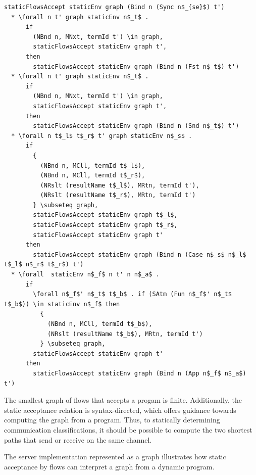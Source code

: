 \documentclass[letterpaper, 11pt]{extarticle}
\begin{document}
\begin{lstlisting}[language=logic, mathescape]
        staticFlowsAccept staticEnv graph (Bind n (Sync n$_{se}$) t')
  * \forall n t' graph staticEnv n$_t$ .
      if
        (NBnd n, MNxt, termId t') \in graph, 
        staticFlowsAccept staticEnv graph t', 
      then
        staticFlowsAccept staticEnv graph (Bind n (Fst n$_t$) t')
  * \forall n t' graph staticEnv n$_t$ .
      if
        (NBnd n, MNxt, termId t') \in graph, 
        staticFlowsAccept staticEnv graph t', 
      then
        staticFlowsAccept staticEnv graph (Bind n (Snd n$_t$) t')
  * \forall n t$_l$ t$_r$ t' graph staticEnv n$_s$ .
      if
        {
          (NBnd n, MCll, termId t$_l$),
          (NBnd n, MCll, termId t$_r$),
          (NRslt (resultName t$_l$), MRtn, termId t'),
          (NRslt (resultName t$_r$), MRtn, termId t')
        } \subseteq graph, 
        staticFlowsAccept staticEnv graph t$_l$, 
        staticFlowsAccept staticEnv graph t$_r$,
        staticFlowsAccept staticEnv graph t'
      then
        staticFlowsAccept staticEnv graph (Bind n (Case n$_s$ n$_l$ t$_l$ n$_r$ t$_r$) t')
  * \forall  staticEnv n$_f$ n t' n n$_a$ .
      if
        \forall n$_f$' n$_t$ t$_b$ . if (SAtm (Fun n$_f$' n$_t$ t$_b$)) \in staticEnv n$_f$ then 
          {
            (NBnd n, MCll, termId t$_b$),
            (NRslt (resultName t$_b$), MRtn, termId t')
          } \subseteq graph,
        staticFlowsAccept staticEnv graph t'
      then
        staticFlowsAccept staticEnv graph (Bind n (App n$_f$ n$_a$) t')
\end{lstlisting}

The smallest graph of flows that accepts a progam is finite.  Additionally, the static
acceptance relation is syntax-directed, which offers guidance towards computing the graph
from a program. Thus, to statically determining communication classifications, it should
be possible to compute the two shortest paths that send or receive on the same channel. 

The server implementation represented as a graph illustrates
how static acceptance by flows can interpret
a graph from a dynamic program.
\end{document}
